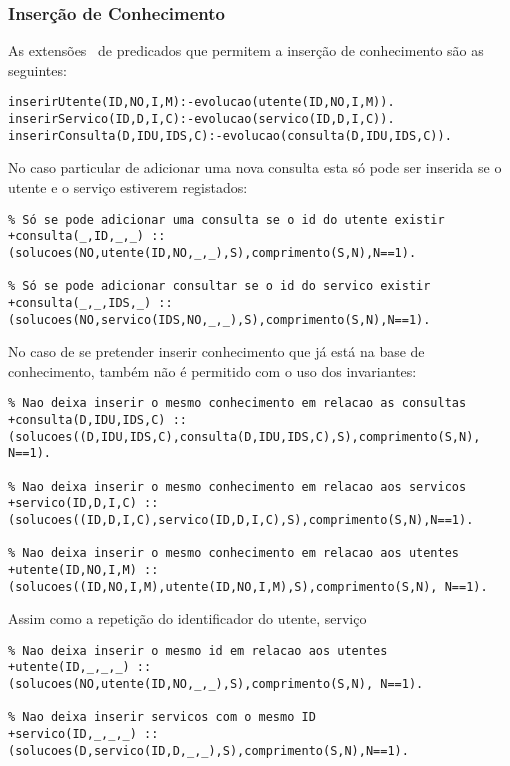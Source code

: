\subsubsection{Inserção de Conhecimento}
As extensões ~de predicados que permitem a inserção de conhecimento são as seguintes: 
\begin{verbatim}
inserirUtente(ID,NO,I,M):-evolucao(utente(ID,NO,I,M)).
inserirServico(ID,D,I,C):-evolucao(servico(ID,D,I,C)).
inserirConsulta(D,IDU,IDS,C):-evolucao(consulta(D,IDU,IDS,C)).
\end{verbatim}
No caso particular de adicionar uma nova consulta esta só pode ser inserida se o utente e o serviço estiverem registados: 
\begin{verbatim}
% Só se pode adicionar uma consulta se o id do utente existir 
+consulta(_,ID,_,_) ::
(solucoes(NO,utente(ID,NO,_,_),S),comprimento(S,N),N==1).

% Só se pode adicionar consultar se o id do servico existir
+consulta(_,_,IDS,_) ::
(solucoes(NO,servico(IDS,NO,_,_),S),comprimento(S,N),N==1).
\end{verbatim}

No caso de se pretender inserir conhecimento que já está na base de conhecimento, também não é permitido com o uso dos invariantes: 

\begin{Verbatim}
% Nao deixa inserir o mesmo conhecimento em relacao as consultas
+consulta(D,IDU,IDS,C) ::
(solucoes((D,IDU,IDS,C),consulta(D,IDU,IDS,C),S),comprimento(S,N),
N==1).

% Nao deixa inserir o mesmo conhecimento em relacao aos servicos
+servico(ID,D,I,C) :: 
(solucoes((ID,D,I,C),servico(ID,D,I,C),S),comprimento(S,N),N==1).

% Nao deixa inserir o mesmo conhecimento em relacao aos utentes
+utente(ID,NO,I,M) :: 
(solucoes((ID,NO,I,M),utente(ID,NO,I,M),S),comprimento(S,N), N==1).
\end{Verbatim}

Assim como a repetição do identificador do utente, serviço 

\begin{Verbatim}
% Nao deixa inserir o mesmo id em relacao aos utentes
+utente(ID,_,_,_) ::
(solucoes(NO,utente(ID,NO,_,_),S),comprimento(S,N), N==1).

% Nao deixa inserir servicos com o mesmo ID
+servico(ID,_,_,_) ::
(solucoes(D,servico(ID,D,_,_),S),comprimento(S,N),N==1).
\end{Verbatim}


